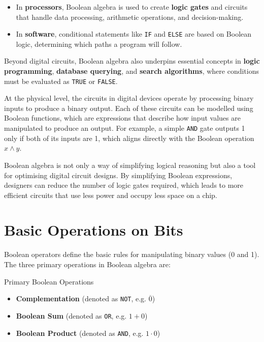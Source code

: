 \begin{itemize}
    \item In \textbf{processors}, Boolean algebra is used to create \textbf{logic gates} and circuits that handle data processing, arithmetic operations, and decision-making.
    \item In \textbf{software}, conditional statements like \texttt{IF} and \texttt{ELSE} are based on Boolean logic, determining which paths a program will follow.
\end{itemize}

Beyond digital circuits, Boolean algebra also underpins essential concepts in \textbf{logic programming}, \textbf{database querying}, and \textbf{search algorithms}, where conditions must be evaluated as \texttt{TRUE} or \texttt{FALSE}.

At the physical level, the circuits in digital devices operate by processing binary inputs to produce a binary output. Each of these circuits can be modelled using Boolean functions, which are expressions that describe how input values are manipulated to produce an output. For example, a simple \texttt{AND} gate outputs 1 only if both of its inputs are 1, which aligns directly with the Boolean operation \( x \land y \).

Boolean algebra is not only a way of simplifying logical reasoning but also a tool for optimising digital circuit designs. By simplifying Boolean expressions, designers can reduce the number of logic gates required, which leads to more efficient circuits that use less power and occupy less space on a chip.

\section{Basic Operations on Bits}
Boolean operators define the basic rules for manipulating binary values (0 and 1). The three primary operations in Boolean algebra are:

\begin{custombox}{Primary Boolean Operations}
    

\begin{itemize}
    \item \textbf{Complementation} (denoted as \texttt{NOT}, e.g. $\overline{0}$)
    \item \textbf{Boolean Sum} (denoted as \texttt{OR}, e.g. $1 + 0$)
    \item \textbf{Boolean Product} (denoted as \texttt{AND}, e.g. $1 \cdot 0$)
\end{itemize}
\end{custombox}

